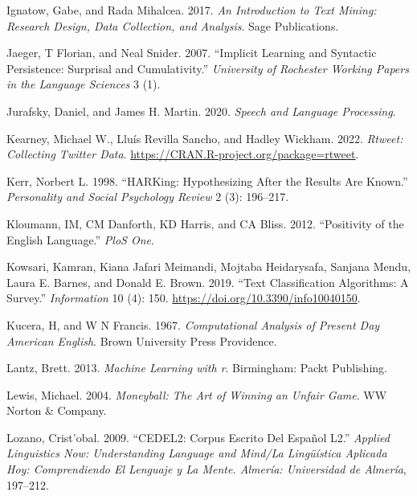 \documentclass[
  letterpaper,
]{latex/krantz}
\newlength{\cslhangindent}
\newlength{\cslentryspacingunit} %
\newenvironment{CSLReferences}[2] %
 {%
  \setlength{\parindent}{0pt}
  \ifodd #1
  \let\oldpar\par
  \def\par{\hangindent=\cslhangindent\oldpar}
  \fi
  \setlength{\parskip}{#2\cslentryspacingunit}
 }%
 {}
\begin{document}
\begin{CSLReferences}{1}{0}
\leavevmode{}%
Ignatow, Gabe, and Rada Mihalcea. 2017. \emph{An Introduction to Text
Mining: Research Design, Data Collection, and Analysis}. Sage
Publications.

\leavevmode{}%
Jaeger, T Florian, and Neal Snider. 2007. {``Implicit Learning and
Syntactic Persistence: Surprisal and Cumulativity.''} \emph{University
of Rochester Working Papers in the Language Sciences} 3 (1).

\leavevmode{}%
Jurafsky, Daniel, and James H. Martin. 2020. \emph{Speech and Language
Processing}.

\leavevmode{}%
Kearney, Michael W., Lluís Revilla Sancho, and Hadley Wickham. 2022.
\emph{Rtweet: Collecting Twitter Data}.
\url{https://CRAN.R-project.org/package=rtweet}.

\leavevmode{}%
Kerr, Norbert L. 1998. {``HARKing: Hypothesizing After the Results Are
Known.''} \emph{Personality and Social Psychology Review} 2 (3):
196--217.

\leavevmode{}%
Kloumann, IM, CM Danforth, KD Harris, and CA Bliss. 2012. {``Positivity
of the English Language.''} \emph{PloS One}.

\leavevmode{}%
Kowsari, Kamran, Kiana Jafari Meimandi, Mojtaba Heidarysafa, Sanjana
Mendu, Laura E. Barnes, and Donald E. Brown. 2019. {``Text
Classification Algorithms: A Survey.''} \emph{Information} 10 (4): 150.
\url{https://doi.org/10.3390/info10040150}.

\leavevmode{}%
Kucera, H, and W N Francis. 1967. \emph{Computational Analysis of
Present Day American English}. Brown University Press Providence.

\leavevmode{}%
Lantz, Brett. 2013. \emph{Machine Learning with r}. Birmingham: Packt
Publishing.

\leavevmode{}%
Lewis, Michael. 2004. \emph{Moneyball: The Art of Winning an Unfair
Game}. WW Norton \& Company.

\leavevmode{}%
Lozano, Crist'obal. 2009. {``CEDEL2: Corpus Escrito Del Español L2.''}
\emph{Applied Linguistics Now: Understanding Language and Mind/La
Lingüística Aplicada Hoy: Comprendiendo El Lenguaje y La Mente. Almería:
Universidad de Almería}, 197--212.


\end{CSLReferences}
\end{document}
